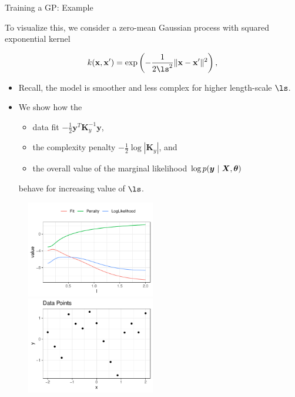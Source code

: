 \documentclass[11pt,compress,t,notes=noshow, xcolor=table]{beamer}
\begin{document}
\begin{vbframe}{Training a GP: Example}

To visualize this, we consider a zero-mean Gaussian process with squared exponential kernel

$$
k(\xv, \xv^\prime) = \exp\left(-\frac{1}{2\ls^2}\|\xv - \xv^\prime\|^2\right),
$$


\begin{itemize}
	\item Recall, the model is smoother and less complex for higher length-scale $\ls$.
	\item We show how the 
	\begin{itemize}
		\item data fit $-\frac{1}{2}\bm{y}^T\bm{K}_y^{-1} \bm{y}$, 
		\item the complexity penalty $- \frac{1}{2} \log \left| \bm{K}_y \right|$, and 
		\item the overall value of the marginal likelihood $\log p(\bm{y} ~|~ \bm{X}, \bm{\theta})$ 
	\end{itemize}
	behave for increasing value of $\ls$.
\end{itemize}

\framebreak 

\begin{figure}
	\includegraphics[width = 0.5\textwidth]{figure/gp_training/fit_vs_penalty.pdf}~	\includegraphics[width = 0.5\textwidth]{figure/gp_training/datapoints.pdf}
\end{figure}


\end{vbframe}
\end{document}
